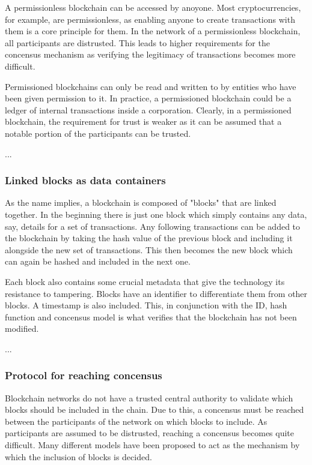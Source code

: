 A permissionless blockchain can be accessed by anoyone. Most
cryptocurrencies, for example, are permissionless, as enabling anyone
to create transactions with them is a core principle for them. In the
network of a permissionless blockchain, all participants are distrusted.
This leads to higher requirements for the concensus mechanism as
verifying the legitimacy of transactions becomes more difficult.

Permissioned blockchains can only be read and written to by entities
who have been given permission to it. In practice, a permissioned
blockchain could be a ledger of internal transactions inside a
corporation. Clearly, in a permissioned blockchain, the requirement
for trust is weaker as it can be assumed that a notable portion of
the participants can be trusted.

...

\subsubsection{Linked blocks as data containers}
As the name implies, a blockchain is composed of "blocks" that are
linked together. In the beginning there is just one block which simply
contains any data, say, details for a set of transactions. Any
following transactions can be added to the blockchain by taking the
hash value of the previous block and including it alongside the new
set of transactions. This then becomes the new block which can again
be hashed and included in the next one.

Each block also contains some crucial metadata that give the
technology its resistance to tampering. Blocks have an identifier to
differentiate them from other blocks. A timestamp is also included. This,
in conjunction with the ID, hash function and concensus model is
what verifies that the blockchain has not been modified.

...


\subsubsection{Protocol for reaching concensus}
Blockchain networks do not have a trusted central authority to
validate which blocks should be included in the chain. Due to this, a
concensus must be reached between the participants of the network on
which blocks to include. As participants are assumed to be distrusted,
reaching a concensus becomes quite difficult. Many different models
have been proposed to act as the mechanism by which the inclusion of
blocks is decided.

